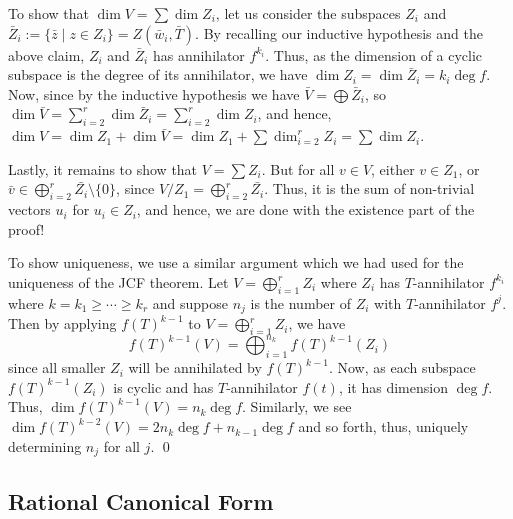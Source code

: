 \documentclass[
]{article}
\theoremstyle{definition}
\begin{document}
To show that \(\dim V = \sum \dim Z_i\), let us consider the subspaces
\(Z_i\) and
\(\bar{Z}_i := \{\bar{z} \mid z \in Z_i\} = Z(\bar{w}_i, \bar{T})\). By
recalling our inductive hypothesis and the above claim, \(Z_i\) and
\(\bar{Z}_i\) has annihilator \(f^{k_i}\). Thus, as the dimension of a
cyclic subspace is the degree of its annihilator, we have
\(\dim Z_i = \dim \bar{Z}_i = k_i \deg f\). Now, since by the inductive
hypothesis we have \(\bar{V} = \bigoplus \bar{Z}_i\), so
\(\dim \bar{V} =  \sum_{i = 2}^r \dim \bar{Z}_i = \sum_{i = 2}^r \dim Z_i\),
and hence,
\(\dim V = \dim Z_1 + \dim \bar{V} = \dim Z_1 + \sum \dim_{i = 2}^r Z_i =  \sum \dim Z_i\).

Lastly, it remains to show that \(V = \sum Z_i\). But for all
\(v \in V\), either \(v \in Z_1\), or
\(\bar{v} \in \bigoplus_{i = 2}^r \bar{Z_i} \setminus \{0\}\), since
\(V / Z_1 = \bigoplus_{i = 2}^r \bar{Z_i}\). Thus, it is the sum of
non-trivial vectors \(u_i\) for \(u_i \in Z_i\), and hence, we are done
with the existence part of the proof!

To show uniqueness, we use a similar argument which we had used for the
uniqueness of the JCF theorem. Let \(V = \bigoplus_{i = 1}^r Z_i\) where
\(Z_i\) has \(T\)-annihilator \(f^{k_i}\) where
\(k = k_1 \ge \cdots \ge k_r\) and suppose \(n_j\) is the number of
\(Z_i\) with \(T\)-annihilator \(f^j\). Then by applying
\(f(T)^{k - 1}\) to \(V = \bigoplus_{i = 1}^r Z_i\), we have
\[f(T)^{k - 1}(V) = \bigoplus_{i = 1}^{n_k} f(T)^{k - 1}(Z_i)\] since
all smaller \(Z_i\) will be annihilated by \(f(T)^{k - 1}\). Now, as
each subspace \(f(T)^{k - 1}(Z_i)\) is cyclic and has \(T\)-annihilator
\(f(t)\), it has dimension \(\deg f\). Thus,
\(\dim f(T)^{k - 1}(V) = n_k \deg f\). Similarly, we see
\(\dim f(T)^{k - 2}(V) = 2 n_k \deg f + n_{k - 1} \deg f\) and so forth,
thus, uniquely determining \(n_j\) for all \(j\). \qed

\hypertarget{rational-canonical-form}{%
\subsection{Rational Canonical Form}\label{rational-canonical-form}}
\end{document}
